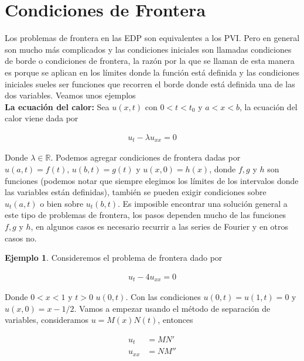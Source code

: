 \documentclass{article}
\theoremstyle{plain}
\theoremstyle{definition}
\newtheorem{ejem}[thm]{Ejemplo}
\begin{document}
\newpage


\section{Condiciones de Frontera}

Los problemas de frontera en las EDP son equivalentes a los PVI.  Pero en general son mucho más complicados y las condiciones iniciales son llamadas condiciones de borde o condiciones de frontera, la razón por la que se llaman de esta manera es porque se aplican en los límites donde la función está definida y las condiciones iniciales sueles ser funciones que recorren el borde donde está definida una de las dos variables. Veamos unos ejemplos\\

\textbf{La ecuación del calor:} Sea $u(x,t)$ con $0<t<t_0$ y $a< x < b$, la ecuación del calor viene dada por

\begin{align*}
    u_t-\lambda u_{xx} = 0
\end{align*}

Donde $\lambda \in \mathbb{R}$. Podemos agregar condiciones de frontera dadas por $u(a,t)= f(t)$, $u(b,t) =g(t)$ y $u(x,0) = h(x)$, donde $f,g$ y $h$ son funciones (podemos notar que siempre elegimos los límites de los intervalos donde las variables están definidas), también se pueden exigir condiciones sobre $u_t(a,t)$ o bien sobre $u_t(b,t)$. Es imposible encontrar una solución general a este tipo de problemas de frontera, los pasos dependen mucho de las funciones $f,g$ y $h$, en algunos casos es necesario recurrir a las series de Fourier y en otros casos no.\\

\begin{ejem}Consideremos el problema de frontera dado por
\end{ejem}

\begin{align*}
    u_t-4u_{xx} = 0
\end{align*}

Donde $0<x<1$ y $t > 0$ $u(0,t)$. Con las condiciones $u(0,t)=u(1,t)=0$ y $u(x,0)=x-1/2$. Vamos a empezar usando el método de separación de variables, consideramos $u=M(x)N(t)$, entonces

\begin{align*}
    u_t &=MN' \\
     u_{xx} &=NM''
\end{align*}
\end{document}
